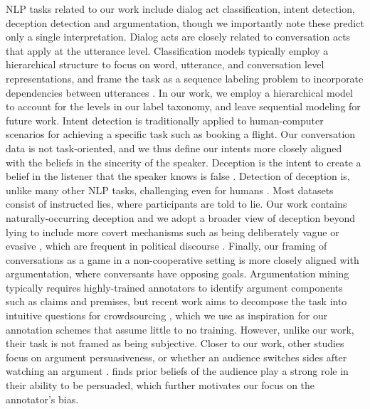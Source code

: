 NLP tasks related to our work include dialog act classification, intent detection, deception detection and argumentation, though we importantly note these predict only a single interpretation. Dialog acts are closely related to conversation acts that apply at the utterance level. Classification models typically employ a hierarchical structure to focus on word, utterance, and conversation level representations, and frame the task as a sequence labeling problem to incorporate dependencies between utterances \cite{Chen:2018}. In our work, we employ a hierarchical model to account for the levels in our label taxonomy, and leave sequential modeling for future work. Intent detection is traditionally applied to human-computer scenarios for achieving a specific task such as booking a flight. 
Our conversation data is not task-oriented, and we thus define our intents more closely aligned with the beliefs in the sincerity of the speaker. Deception is the intent to create a belief in the listener that the speaker knows is false \cite{Girlea:2017}. Detection of deception is, unlike many other NLP tasks, challenging even for humans \cite{Ott:2011}.
Most datasets consist of instructed lies, where participants are told to lie. 
Our work contains naturally-occurring deception and we adopt a broader view of deception beyond lying to include more covert mechanisms such as being deliberately vague or evasive \cite{Clementson:2018}, which are frequent in political discourse \cite{Bull:2008}. Finally, our framing of conversations as a game in a non-cooperative setting is more closely aligned with argumentation, where conversants have opposing goals. Argumentation mining typically requires highly-trained annotators to identify argument components such as claims and premises, but recent work aims to decompose the task into intuitive questions for crowdsourcing \cite{Miller:2019}, which we use as inspiration for our annotation schemes that assume little to no training. However, unlike our work, their task is not framed as being subjective. Closer to our work, other studies focus on argument persuasiveness, or whether an audience switches sides after watching an argument \cite{Zhang:2016,Durmus:2018}.  finds prior beliefs of the audience play a strong role in their ability to be persuaded, which further motivates our focus on the annotator's bias.
 
